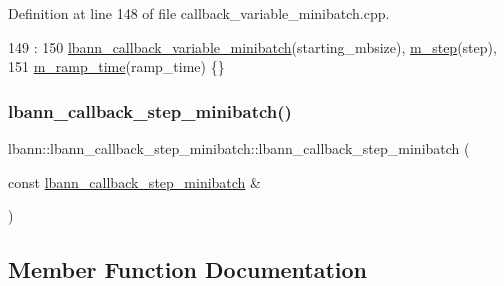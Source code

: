Definition at line 148 of file callback\+\_\+variable\+\_\+minibatch.\+cpp.


\begin{DoxyCode}
149                                                 :
150   \hyperlink{classlbann_1_1lbann__callback__variable__minibatch_a970a03f0d297f8447020e85d23f5ee73}{lbann\_callback\_variable\_minibatch}(starting\_mbsize), 
      \hyperlink{classlbann_1_1lbann__callback__step__minibatch_a1d150c95b193f9a24c8d7d73506b034c}{m\_step}(step),
151   \hyperlink{classlbann_1_1lbann__callback__step__minibatch_ad367d8969b52755f768085d8db98449c}{m\_ramp\_time}(ramp\_time) \{\}
\end{DoxyCode}
\mbox{\label{classlbann_1_1lbann__callback__step__minibatch_a66b34b96845274563dd72172dafd9079}} 
\subsubsection{\texorpdfstring{lbann\+\_\+callback\+\_\+step\+\_\+minibatch()}{lbann\_callback\_step\_minibatch()}\hspace{0.1cm}{\footnotesize\ttfamily [2/2]}}
{\footnotesize\ttfamily lbann\+::lbann\+\_\+callback\+\_\+step\+\_\+minibatch\+::lbann\+\_\+callback\+\_\+step\+\_\+minibatch (\begin{DoxyParamCaption}\item[{const \hyperlink{classlbann_1_1lbann__callback__step__minibatch}{lbann\+\_\+callback\+\_\+step\+\_\+minibatch} \&}]{ }\end{DoxyParamCaption})\hspace{0.3cm}{\ttfamily [default]}}



\subsection{Member Function Documentation}
\mbox{\label{classlbann_1_1lbann__callback__step__minibatch_a3c291a8908f893d0ca372ae7c650bbb2}} 

